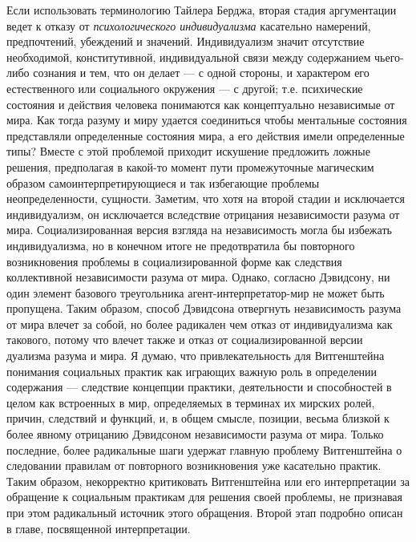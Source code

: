 \documentclass[11pt]{book}
\begin{document}
Если использовать терминологию Тайлера Берджа, вторая стадия аргументации ведет к отказу от \textit{психологического индивидуализма} касательно намерений, предпочтений, убеждений и значений. Индивидуализм значит отсутствие необходимой, конститутивной, индивидуальной связи между содержанием чьего-либо сознания и тем, что он делает --- с одной стороны, и характером его естественного или социального окружения --- с другой; т.е. психические состояния и действия человека понимаются как концептуально независимые от мира. Как тогда разуму и миру удается соединиться чтобы ментальные состояния представляли определенные состояния мира, а его действия имели определенные типы? Вместе с этой проблемой приходит искушение предложить ложные решения, предполагая в какой-то момент пути промежуточные магическим образом самоинтерпретирующиеся и так избегающие проблемы неопределенности, сущности. Заметим, что хотя на второй стадии и исключается индивидуализм, он исключается вследствие отрицания независимости разума от мира. Социализированная версия взгляда на независимость могла бы избежать индивидуализма, но в конечном итоге не предотвратила бы повторного возникновения проблемы в социализированной форме как следствия коллективной независимости разума от мира. Однако, согласно Дэвидсону, ни один элемент базового треугольника агент-интерпретатор-мир не может быть пропущена. Таким образом, способ Дэвидсона отвергнуть независимость разума от мира влечет за собой, но более радикален чем отказ от индивидуализма как такового, потому что влечет также и отказ от социализированной версии дуализма разума и мира. Я думаю, что привлекательность для Витгенштейна понимания социальных практик как играющих важную роль в определении содержания --- следствие концепции практики, деятельности и способностей в целом как встроенных в мир, определяемых в терминах их мирских ролей, причин, следствий и функций, и, в общем смысле, позиции, весьма близкой к более явному отрицанию Дэвидсоном независимости разума от мира. Только последние, более радикальные шаги удержат главную проблему Витгенштейна о следовании правилам от повторного возникновения уже касательно практик. Таким образом, некорректно критиковать Витгенштейна или его интерпретации за обращение к социальным практикам для решения своей проблемы, не признавая при этом радикальный источник этого обращения. Второй этап подробно описан в главе, посвященной интерпретации.
\end{document}
